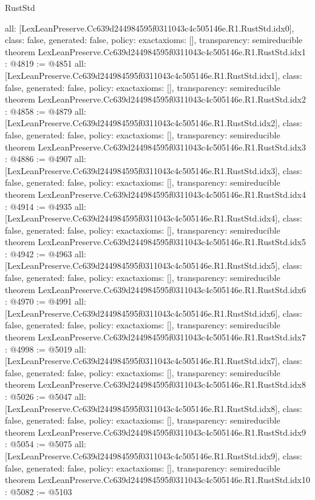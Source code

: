 \begin{lexlean}{RustStd}
\begin{coremodule}
{  all: [LexLeanPreserve.Cc639d244984595f0311043c4c505146e.R1.RustStd.idx0],
  class: false,
  generated: false,
  policy: exact{axioms: []},
  transparency: semireducible
}
theorem LexLeanPreserve.Cc639d244984595f0311043c4c505146e.R1.RustStd.idx1 : @4819 := @4851 {
  all: [LexLeanPreserve.Cc639d244984595f0311043c4c505146e.R1.RustStd.idx1],
  class: false,
  generated: false,
  policy: exact{axioms: []},
  transparency: semireducible
}
theorem LexLeanPreserve.Cc639d244984595f0311043c4c505146e.R1.RustStd.idx2 : @4858 := @4879 {
  all: [LexLeanPreserve.Cc639d244984595f0311043c4c505146e.R1.RustStd.idx2],
  class: false,
  generated: false,
  policy: exact{axioms: []},
  transparency: semireducible
}
theorem LexLeanPreserve.Cc639d244984595f0311043c4c505146e.R1.RustStd.idx3 : @4886 := @4907 {
  all: [LexLeanPreserve.Cc639d244984595f0311043c4c505146e.R1.RustStd.idx3],
  class: false,
  generated: false,
  policy: exact{axioms: []},
  transparency: semireducible
}
theorem LexLeanPreserve.Cc639d244984595f0311043c4c505146e.R1.RustStd.idx4 : @4914 := @4935 {
  all: [LexLeanPreserve.Cc639d244984595f0311043c4c505146e.R1.RustStd.idx4],
  class: false,
  generated: false,
  policy: exact{axioms: []},
  transparency: semireducible
}
theorem LexLeanPreserve.Cc639d244984595f0311043c4c505146e.R1.RustStd.idx5 : @4942 := @4963 {
  all: [LexLeanPreserve.Cc639d244984595f0311043c4c505146e.R1.RustStd.idx5],
  class: false,
  generated: false,
  policy: exact{axioms: []},
  transparency: semireducible
}
theorem LexLeanPreserve.Cc639d244984595f0311043c4c505146e.R1.RustStd.idx6 : @4970 := @4991 {
  all: [LexLeanPreserve.Cc639d244984595f0311043c4c505146e.R1.RustStd.idx6],
  class: false,
  generated: false,
  policy: exact{axioms: []},
  transparency: semireducible
}
theorem LexLeanPreserve.Cc639d244984595f0311043c4c505146e.R1.RustStd.idx7 : @4998 := @5019 {
  all: [LexLeanPreserve.Cc639d244984595f0311043c4c505146e.R1.RustStd.idx7],
  class: false,
  generated: false,
  policy: exact{axioms: []},
  transparency: semireducible
}
theorem LexLeanPreserve.Cc639d244984595f0311043c4c505146e.R1.RustStd.idx8 : @5026 := @5047 {
  all: [LexLeanPreserve.Cc639d244984595f0311043c4c505146e.R1.RustStd.idx8],
  class: false,
  generated: false,
  policy: exact{axioms: []},
  transparency: semireducible
}
theorem LexLeanPreserve.Cc639d244984595f0311043c4c505146e.R1.RustStd.idx9 : @5054 := @5075 {
  all: [LexLeanPreserve.Cc639d244984595f0311043c4c505146e.R1.RustStd.idx9],
  class: false,
  generated: false,
  policy: exact{axioms: []},
  transparency: semireducible
}
theorem LexLeanPreserve.Cc639d244984595f0311043c4c505146e.R1.RustStd.idx10 : @5082 := @5103 {
}
\end{coremodule}
\end{lexlean}
